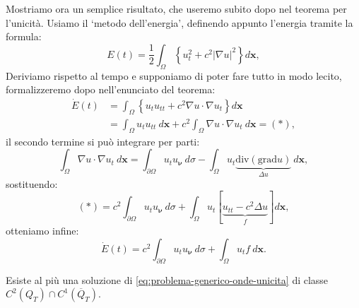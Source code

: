 \documentclass[10pt,a4paper,twoside,openright]{book}
\newcommand{\x}{\mathbf{x}}
\begin{document}
Mostriamo ora un semplice risultato, che useremo subito dopo nel teorema per l'unicità. Usiamo il `metodo dell'energia', definendo appunto l'energia tramite la formula:
\begin{equation}
	E( t) =\frac{1}{2}\int _{\Omega }\left\{u_{t}^{2} +c^{2}| \nabla u| ^{2}\right\} d\x ,
\end{equation}
Deriviamo rispetto al tempo e supponiamo di poter fare tutto in modo lecito, formalizzeremo dopo nell'enunciato del teorema:
\begin{align*}
	\dot{E}( t) & =\int _{\Omega }\left\{u_{t} u_{tt} +c^{2} \nabla u\cdotp \nabla u_{t}\right\} d\x                          \\
	            & =\int _{\Omega } u_{t} u_{tt} \ d\x +c^{2}\int _{\Omega } \nabla u\cdotp \nabla u_{t} \ d\x =( *) , 
\end{align*}
il secondo termine si può integrare per parti:
\begin{equation*}
	\int _{\Omega } \nabla u\cdotp \nabla u_{t} \ d\x =\int _{\partial \Omega } u_{t} u_{\bm{\nu }} \ d\sigma -\int _{\Omega } u_{t}\underbrace{\mathrm{div}(\mathrm{grad} u)}_{\Delta u} \ d\x ,
\end{equation*}
sostituendo:
\begin{equation*}
	( *) =c^{2}\int _{\partial \Omega } u_{t} u_{\bm{\nu }} \ d\sigma +\int _{\Omega } u_{t}[\underbrace{u_{tt} -c^{2} \Delta u}_{f}] d\x ,
\end{equation*}
otteniamo infine:
\begin{equation}
	\dot{E}( t) =c^{2}\int _{\partial \Omega } u_{t} u_{\bm{\nu }} \ d\sigma +\int _{\Omega } u_{t} f\ d\x .
	\label{eq:onde-derivata-energia}
\end{equation}
\begin{theorem}
	Esiste al più una soluzione di \eqref{eq:problema-generico-onde-unicita} di classe $C^{2}( Q_{T}) \cap C^{1}(\overline{Q}_{T})$.
\end{theorem}
\end{document}

